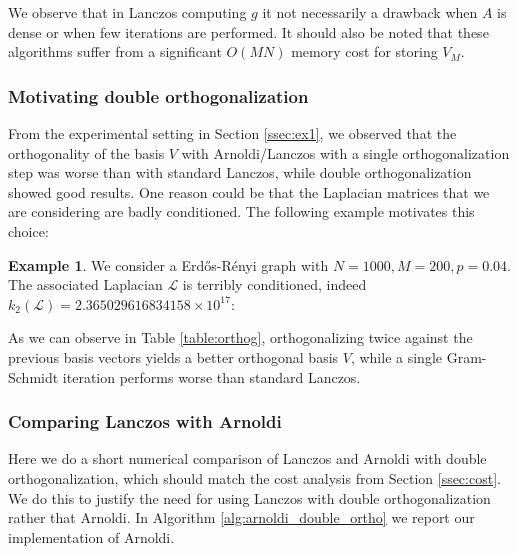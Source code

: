 \documentclass[11pt]{article}
\renewcommand{\L}{\mathcal{L}}
\theoremstyle{definition}
\newtheorem{example}[theorem]{Example}
\theoremstyle{remark}
\theoremstyle{experimental}
\begin{document}
We observe that in Lanczos computing $ g $ it not necessarily a drawback when $ A $ is dense or when few iterations are performed.
It should also be noted that these algorithms suffer from a significant $ O(M N) $ memory cost for storing $ V_M $.


\subsubsection{Motivating double orthogonalization}

  From the experimental setting in Section \ref{ssec:ex1}, we observed that the orthogonality of the
  basis $ V $ with Arnoldi/Lanczos with a single orthogonalization step was worse than with standard Lanczos, while double orthogonalization showed good
  results. One reason could be that the Laplacian matrices that we are considering are badly
  conditioned. The following example motivates this choice:
\begin{example}
    
We consider a Erdős-Rényi graph with $ N = 1000,M=200, p=0.04 $.
The associated Laplacian $ \L $ is terribly conditioned, indeed $ k_2(\L) = 2.365029616834158 \times 10^{17} $:
  

  \end{example}
  As we can observe in Table \ref{table:orthog}, orthogonalizing twice against the previous
  basis vectors yields a better orthogonal basis $ V$, while a single Gram-Schmidt iteration performs worse than standard Lanczos.


\subsubsection{Comparing Lanczos with Arnoldi}

Here we do a short numerical comparison of Lanczos and Arnoldi with double orthogonalization, which
should match the cost analysis from Section \ref{ssec:cost}. We do this to justify 
the need for using Lanczos with double orthogonalization rather that Arnoldi. In Algorithm
\ref{alg:arnoldi_double_ortho} we report our implementation of Arnoldi.
\end{document}
